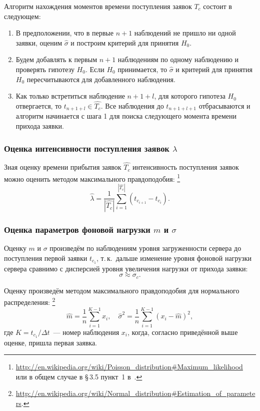 \documentclass[a4paper,10pt]{article}
\begin{document}
Алгоритм нахождения моментов времени поступления заявок $T_c$ 
состоит в следующем:
\begin{enumerate}
  \item В предположении, что в первые $n+1$ наблюдений не пришло ни одной 
  заявки, оценим $\widehat{\sigma}$ и построим критерий для принятия $H_0$.
  \item Будем добавлять к первым $n+1$ наблюдениям по одному наблюдению и 
  проверять гипотезу $H_0$.
  Если $H_0$ принимается, то $\widehat{\sigma}$ и критерий для принятия $H_0$ 
  пересчитываются для добавленного наблюдения.
  \item Как только встретиться наблюдение $n+1+l$, для которого гипотеза $H_0$
  отвергается, то \mbox{$t_{n+1+l} \in \widehat{T_c}$}. 
  Все наблюдения до $t_{n+1+l+1}$ отбрасываются и алгоритм начинается с шага 1
  для поиска следующего момента времени прихода заявки.
\end{enumerate}

\subsubsection{Оценка интенсивности поступления заявок $\lambda$}%
\label{lc0-iter-lambda}
Зная оценку времени прибытия заявок $\widehat{T_c}$ 
интенсивность поступления заявок можно оценить
методом максимального правдоподобия:%
\footnote{{\url{http://en.wikipedia.org/wiki/Poisson\_distribution\#Maximum\_likelihood}} 
или в общем случае в \S\,3.5 пункт~1 в~\cite{ivchmed2010matstat}.}
$$\widehat{\lambda} = 
    \frac{1}{|\widehat{T_c}|} 
        \sum\limits_{i=1}^{|\widehat{T_c}|} (t_{c_{i+1}} - t_{c_i}).$$

\subsubsection{Оценка параметров фоновой нагрузки $m$ и $\sigma$}%
\label{lc0-m-sigma}
Оценку $m$ и $\sigma$ произведём по наблюдениям уровня загруженности 
сервера до поступления первой заявки $t_{c_1}$, 
т.\,к.~дальше изменение уровня фоновой нагрузки сервера сравнимо с дисперсией 
уровня увеличения нагрузки от прихода заявки: 
$$\sigma \approx \sigma_c.$$

Оценку произведём методом максимального правдоподобия для нормального 
распределения:%
\footnote{{\url{http://en.wikipedia.org/wiki/Normal\_distribution\#Estimation_of_parameters}}.} 
$$
  \widehat{m} = \frac{1}{n} \sum\limits_{i=1}^{K-1} x_i, \quad
  \widehat{\sigma}^2 = 
      \frac{1}{n} \sum\limits_{i=1}^{K-1} (x_i - \widehat{m})^2,
$$
где $K = t_{c_1} / \Delta t$~--- 
номер наблюдения $x_i$, когда, согласно приведённой выше оценке,
пришла первая заявка.
\end{document}
